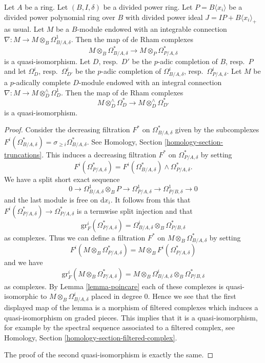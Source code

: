\begin{lemma}
\label{lemma-relative-poincare}
Let $A$ be a ring. Let $(B, I, \delta)$ be a divided power ring.
Let $P = B\langle x_i \rangle$ be a divided power polynomial
ring over $B$ with divided power ideal $J = IP + B\langle x_i \rangle_{+}$
as usual. Let $M$ be a $B$-module endowed with an integrable connection
$\nabla : M \to M \otimes_B \Omega^1_{B/A, \delta}$. Then the map of
de Rham complexes
$$
M \otimes_B \Omega^*_{B/A, \delta}
\longrightarrow
M \otimes_P \Omega^*_{P/A, \delta}
$$
is a quasi-isomorphism. Let $D$, resp.\ $D'$ be the $p$-adic completion of
$B$, resp.\ $P$ and let $\Omega^i_D$, resp.\ $\Omega^i_{D'}$ be the $p$-adic
completion of $\Omega^i_{B/A, \delta}$,
resp.\ $\Omega^i_{P/A, \delta}$. Let $M$ be a $p$-adically complete
$D$-module endowed with an integral connection
$\nabla : M \to M \otimes^\wedge_D \Omega^1_D$.
Then the map of de Rham complexes
$$
M \otimes^\wedge_D \Omega^*_D
\longrightarrow
M \otimes^\wedge_D \Omega^*_{D'}
$$
is a quasi-isomorphism.
\end{lemma}

\begin{proof}
Consider the decreasing filtration $F^*$ on $\Omega^*_{B/A, \delta}$
given by the subcomplexes
$F^i(\Omega^*_{B/A, \delta}) = \sigma_{\geq i}\Omega^*_{B/A, \delta}$.
See Homology, Section \ref{homology-section-truncations}.
This induces a decreasing filtration $F^*$ on $\Omega^*_{P/A, \delta}$
by setting
$$
F^i(\Omega^*_{P/A, \delta}) =
F^i(\Omega^*_{B/A, \delta}) \wedge \Omega^*_{P/A, \delta}.
$$
We have a split short exact sequence
$$
0 \to \Omega^1_{B/A, \delta} \otimes_B P \to
\Omega^1_{P/A, \delta} \to
\Omega^1_{P/B, \delta} \to 0
$$
and the last module is free on $\text{d}x_i$. It follows from this that
$F^i(\Omega^*_{P/A, \delta}) \to \Omega^*_{P/A, \delta}$ is a termwise
split injection and that
$$
\text{gr}^i_F(\Omega^*_{P/A, \delta}) =
\Omega^i_{B/A, \delta} \otimes_B \Omega^*_{P/B, \delta}
$$
as complexes. Thus we can define a filtration $F^*$ on
$M \otimes_B \Omega^*_{B/A, \delta}$ by setting
$$
F^i(M \otimes_B \Omega^*_{P/A, \delta}) =
M \otimes_B F^i(\Omega^*_{P/A, \delta})
$$
and we have
$$
\text{gr}^i_F(M \otimes_B \Omega^*_{P/A, \delta}) =
M \otimes_B \Omega^i_{B/A, \delta} \otimes_B \Omega^*_{P/B, \delta}
$$
as complexes.
By Lemma \ref{lemma-poincare} each of these complexes is
quasi-isomorphic to $M \otimes_B \Omega^i_{B/A, \delta}$ placed in degree $0$.
Hence we see that the first displayed map of the lemma is a morphism of
filtered complexes which induces a quasi-isomorphism on graded pieces. This
implies that it is a quasi-isomorphism, for example by the spectral sequence
associated to a filtered complex, see
Homology, Section \ref{homology-section-filtered-complex}.

\medskip\noindent
The proof of the second quasi-isomorphism is exactly the same.
\end{proof}



